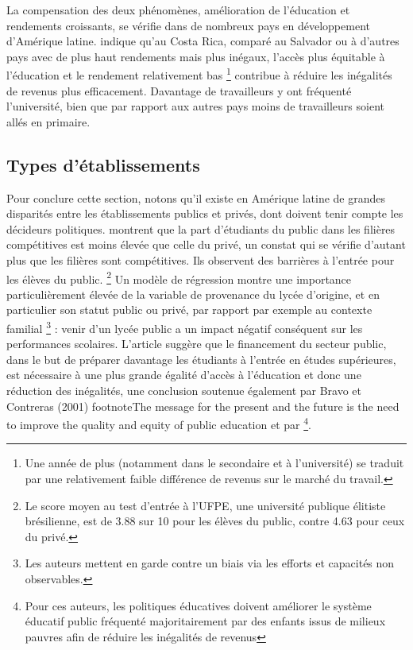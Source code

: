\documentclass[pagesize, twoside=off, bibliography=totoc, DIV=calc, fontsize=12pt, a4paper, french]{scrartcl}
\begin{document}
La compensation des deux phénomènes, amélioration de l’éducation et rendements croissants, se vérifie dans de nombreux pays en développement d’Amérique latine.  indique qu’au Costa Rica, comparé au Salvador ou à d’autres pays avec de plus haut rendements mais plus inégaux, l’accès plus équitable à l’éducation et le rendement relativement bas \footnote{Une année de plus (notamment dans le secondaire et à l’université) se traduit par une relativement faible différence de revenus sur le marché du travail.} contribue à réduire les inégalités de revenus plus efficacement. Davantage de travailleurs y ont fréquenté l’université, bien que par rapport aux autres pays moins de travailleurs soient allés en primaire.

\subsection{Types d’établissements}

Pour conclure cette section, notons qu’il existe en Amérique latine de grandes disparités entre les établissements publics et privés, dont doivent tenir compte les décideurs politiques.  montrent que la part d’étudiants du public dans les filières compétitives est moins élevée que celle du privé, un constat qui se vérifie d’autant plus que les filières sont compétitives. Ils observent des barrières à l’entrée pour les élèves du public. \footnote{Le score moyen au test d’entrée à l’UFPE, une université publique élitiste brésilienne, est de 3.88 sur 10 pour les élèves du public, contre 4.63 pour ceux du privé.} Un modèle de régression montre une importance particulièrement élevée de la variable de provenance du lycée d’origine, et en particulier son statut public ou privé, par rapport par exemple au contexte familial \footnote{Les auteurs mettent en garde contre un biais via les efforts et capacités non observables.} : venir d’un lycée public a un impact négatif conséquent sur les performances scolaires. L’article suggère que le financement du secteur public, dans le but de préparer davantage les étudiants à l’entrée en études supérieures, est nécessaire à une plus grande égalité d’accès à l’éducation et donc une réduction des inégalités, une conclusion soutenue également par Bravo et Contreras (2001) footnote{\og{}The message for the present and the future is the need to improve the quality and equity of public education\fg{}} et par \citet{ferreira_rise_2008} \footnote{Pour ces auteurs, les politiques éducatives doivent améliorer le système éducatif public fréquenté majoritairement par des enfants issus de milieux pauvres afin de réduire les inégalités de revenus}.
\end{document}
